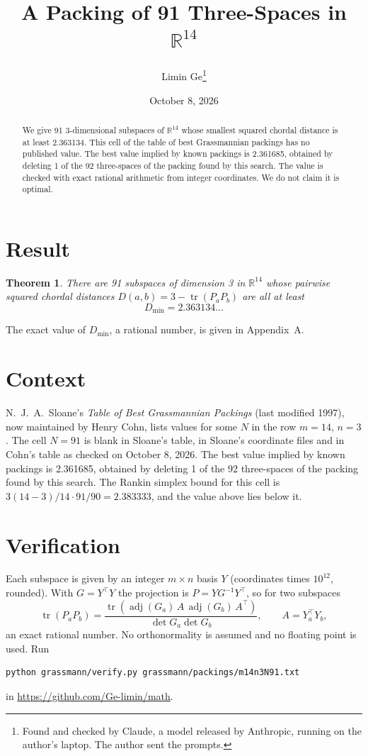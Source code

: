 \documentclass[11pt,a4paper]{article}
\title{A Packing of 91 Three-Spaces in $\mathbb{R}^{14}$}
\author{Limin Ge\thanks{Found and checked by Claude, a model released by Anthropic, running on the author's laptop. The author sent the prompts.}}
\date{October 8, 2026}
\newtheorem*{theorem}{Theorem}
\begin{document}
\maketitle
\begin{abstract}
We give 91 3-dimensional subspaces of $\mathbb{R}^{14}$ whose smallest squared chordal distance is at least 2.363134. This cell of the table of best Grassmannian packings has no published value. The best value implied by known packings is 2.361685, obtained by deleting 1 of the 92 three-spaces of the packing found by this search. The value is checked with exact rational arithmetic from integer coordinates. We do not claim it is optimal.
\end{abstract}

\section{Result}
\begin{theorem}
There are 91 subspaces of dimension 3 in $\mathbb{R}^{14}$ whose pairwise squared chordal distances $D(a,b) = 3 - \operatorname{tr}(P_aP_b)$ are all at least
\[ D_{\min} = 2.363134\ldots \]
\end{theorem}
The exact value of $D_{\min}$, a rational number, is given in Appendix~A.


\section{Context}
N.~J.~A.~Sloane's \emph{Table of Best Grassmannian Packings} (last modified 1997), now maintained by Henry Cohn, lists values for some $N$ in the row $m=14$, $n=3$. The cell $N=91$ is blank in Sloane's table, in Sloane's coordinate files and in Cohn's table as checked on October 8, 2026. The best value implied by known packings is 2.361685, obtained by deleting 1 of the 92 three-spaces of the packing found by this search. The Rankin simplex bound for this cell is $3(14-3)/14\cdot 91/90 = 2.383333$, and the value above lies below it.


\section{Verification}
Each subspace is given by an integer $m\times n$ basis $Y$ (coordinates times $10^{12}$, rounded). With $G=Y^\top Y$ the projection is $P=YG^{-1}Y^\top$, so for two subspaces
\[ \operatorname{tr}(P_aP_b)=\frac{\operatorname{tr}(\operatorname{adj}(G_a)\,A\,\operatorname{adj}(G_b)\,A^\top)}{\det G_a\det G_b},\qquad A=Y_a^\top Y_b, \]
an exact rational number. No orthonormality is assumed and no floating point is used. Run
\begin{verbatim}
python grassmann/verify.py grassmann/packings/m14n3N91.txt
\end{verbatim}
in \url{https://github.com/Ge-limin/math}.
\end{document}
